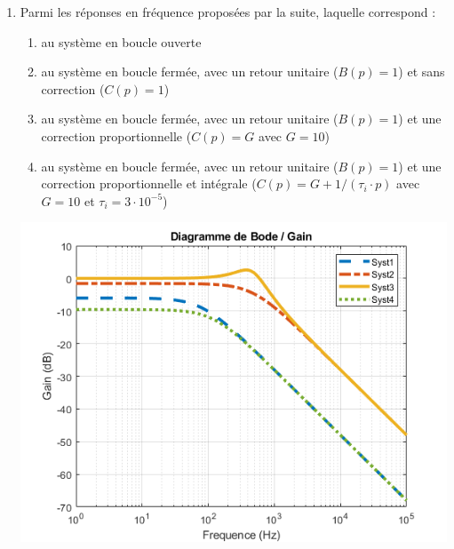 \begin{enumerate}
	\item Parmi les réponses en fréquence proposées par la suite, laquelle correspond :
\begin{enumerate}
	\item au système en boucle ouverte 
	\item au système en boucle fermée, avec un retour unitaire ($B(p) = 1$) et sans correction ($C(p) = 1$)
	\item au système en boucle fermée, avec un retour unitaire ($B(p) = 1$) et une correction proportionnelle ($C(p) = G$ avec $G = 10$)
	\item au système en boucle fermée, avec un retour unitaire ($B(p) = 1$) et une correction proportionnelle et intégrale ($C(p) = G + 1/(\tau_i \cdot p)$ avec $G = 10$ et $\tau_i = 3 \cdot 10^{-5}$)
\end{enumerate}

\begin{center}
	\includegraphics[width=15cm]{images/TD/sys_boucle_bode.png}
\end{center}

\end{enumerate}
